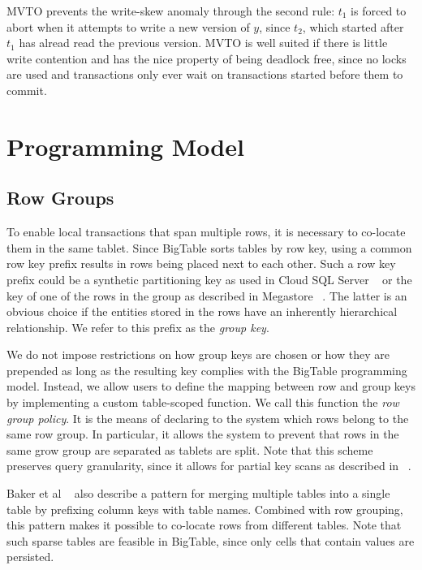 \documentclass[10pt,final,journal]{IEEEtran}
\begin{document}
MVTO prevents the write-skew anomaly through the second rule: $t_1$ is forced to abort when it attempts to write a new version of $y$, since $t_2$, which started after $t_1$ has alread read the previous version. MVTO is well suited if there is little write contention and has the nice property of being deadlock free, since no locks are used and transactions only ever wait on transactions started before them to commit.

\section{Programming Model}

\subsection{Row Groups}
To enable local transactions that span multiple rows, it is necessary to co-locate them in the same tablet. Since BigTable sorts tables by row key, using a common row key prefix results in rows being placed next to each other. Such a row key prefix could be a synthetic partitioning key as used in Cloud SQL Server ~\cite{Bernstein:2011:AMS:2004686.2005651} or the key of one of the rows in the group as described in Megastore ~\cite{Baker:2011:8530095}. The latter is an obvious choice if the entities stored in the rows have an inherently hierarchical relationship. We refer to this prefix as the \emph{group key}.

We do not impose restrictions on how group keys are chosen or how they are prepended as long as the resulting key complies with the BigTable programming model. Instead, we allow users to define the mapping between row and group keys by implementing a custom table-scoped function. We call this function the  \emph{row group policy}. It is the means of declaring to the system which rows belong to the same row group. In particular, it allows the system to prevent that rows in the same grow group are separated as tablets are split. Note that this scheme preserves query granularity, since it allows for partial key scans as described in ~\cite{George:2011}.

Baker et al ~\cite{Baker:2011:8530095} also describe a pattern for merging multiple tables into a single table by prefixing column keys with table names. Combined with row grouping, this pattern makes it possible to co-locate rows from different tables. Note that such sparse tables are feasible in BigTable, since only cells that contain values are persisted.
\end{document}
